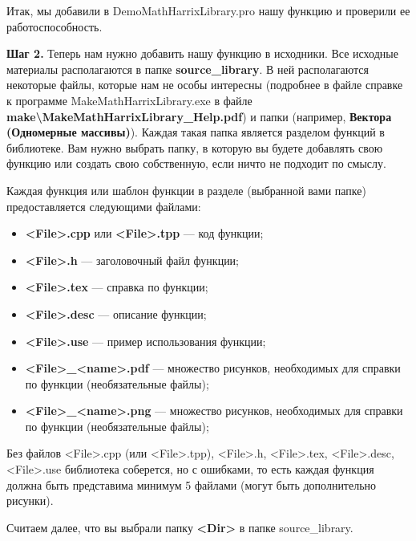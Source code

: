 Итак, мы добавили в DemoMathHarrixLibrary.pro нашу функцию и проверили ее работоспособность. 

\textbf{Шаг 2.}\label{step2} Теперь нам нужно добавить нашу функцию в исходники. Все исходные материалы располагаются в папке \textbf{source\_library}. В ней располагаются некоторые файлы, которые нам не особы интересны (подробнее в файле справке к программе MakeMathHarrixLibrary.exe в файле \textbf{make\textbackslash MakeMathHarrixLibrary\_Help.pdf}) и папки (например, \textbf{Вектора (Одномерные массивы)}). Каждая такая папка является разделом функций в библиотеке. Вам нужно выбрать папку, в которую вы будете добавлять свою функцию или создать свою собственную, если ничто не подходит по смыслу.

Каждая функция или шаблон функции в разделе (выбранной вами папке) предоставляется следующими файлами:
\begin{itemize}
\item \textbf{<File>.cpp} или \textbf{<File>.tpp} --- код функции;
\item \textbf{<File>.h} --- заголовочный файл функции;
\item \textbf{<File>.tex} --- справка по функции;
\item \textbf{<File>.desc} --- описание функции;
\item \textbf{<File>.use} --- пример использования функции;
\item \textbf{<File>\_<name>.pdf} --- множество рисунков, необходимых для справки по функции (необязательные файлы);
\item \textbf{<File>\_<name>.png} --- множество рисунков, необходимых для справки по функции (необязательные файлы);
\end{itemize}

Без файлов <File>.cpp (или <File>.tpp), <File>.h, <File>.tex, <File>.desc, <File>.use библиотека соберется, но с ошибками, то есть каждая функция должна быть представима минимум 5 файлами (могут быть дополнительно рисунки).

Считаем далее, что вы выбрали папку \textbf{<Dir>} в папке source\_library. 

